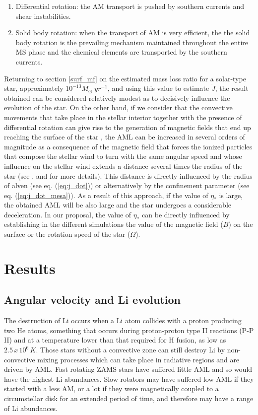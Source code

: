 \documentclass[fleqn,usenatbib]{mnras}
\begin{document}
\begin{enumerate}
    \item Differential rotation: the AM transport is pushed by southern currents and shear instabilities.
    \item Solid body rotation: when the transport of AM is very efficient, the the solid body rotation is the prevailing mechanism maintained throughout the entire MS phase and the chemical elements are transported by the southern currents.
\end{enumerate}

Returning to section \ref{surf_mf} on the estimated mass loss ratio for a solar-type star, approximately $10^{-13}M_{\odot} \; yr^{-1}$, and using this value to estimate $\Dot{J}$, the result obtained can be considered relatively modest as to decisively influence the evolution of the star. On the other hand, if we consider that the convective movements that take place in the stellar interior together with the presence of differential rotation can give rise to the generation of magnetic fields that end up reaching the surface of the star \citep{Langer2012}, the AML can be increased in several orders of magnitude as a consequence of the magnetic field that forces the ionized particles that compose the stellar wind to turn with the same angular speed and whose influence on the stellar wind extends a distance several times the radius of the star (see \citet{UdDoula2002}, \citet{Ud-Doula2007} and \citet{Ud-Doula2008} for more details). This distance is directly influenced by the radius of alven (see eq. (\ref{eq:j_dot})) or alternatively by the confinement parameter (see eq. (\ref{eq:j_dot_mesa})). As a result of this approach, if the value of $\eta_*$ is large, the obtained AML will be also large and the star undergoes a considerable deceleration. In our proposal, the value of $\eta_*$ can be directly influenced by establishing in the different simulations the value of the magnetic field ($B$) on the surface or the rotation speed of the star ($\Omega$). 

\section{Results}
\subsection{Angular velocity and Li evolution}
The destruction of Li occurs when a Li atom collides with a proton producing two He atoms, something that occurs during proton-proton type II reactions (P-P II) and at a temperature lower than that required for H fusion, as low as $2.5\, x\, 10^6\, K$. Those stars without a convective zone can still destroy Li by non-convective mixing processes which can take place in radiative regions and are driven by AML. Fast rotating ZAMS stars have suffered little AML and so would have the highest Li abundances. Slow rotators may have suffered low AML if they started with a less AM, or a lot if they were magnetically coupled to a circumstellar disk for an extended period of time, and therefore may have a range of Li abundances. \par
\end{document}

